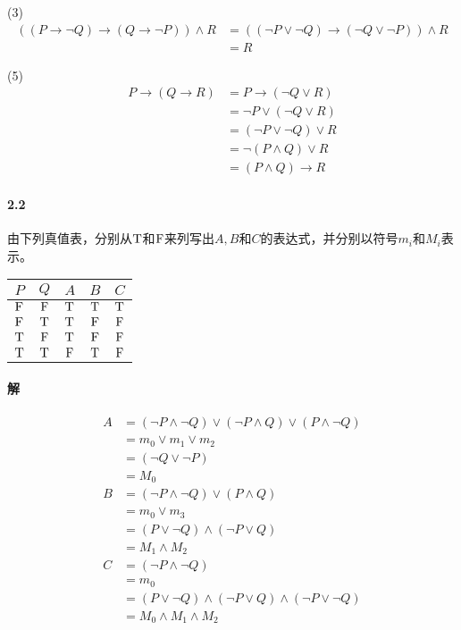 \documentclass[hyperref, UTF8]{ctexart}
\newcommand{\true}{{\rm T}}
\newcommand{\false}{{\rm F}}
\begin{document}
(3)
\begin{align*}
((P \rightarrow \lnot Q) \rightarrow (Q \rightarrow \lnot P)) \land R &=(( \lnot P \lor \lnot Q) \rightarrow ( \lnot Q \lor \lnot P)) \land R \\ &=R
\end{align*}

(5)
\begin{align*}
P \rightarrow (Q \rightarrow R)&=P \rightarrow ( \lnot Q \lor R) \\ &= \lnot P \lor ( \lnot Q \lor R) \\ &=( \lnot P \lor \lnot Q) \lor R \\ &= \lnot (P \land Q) \lor R \\ &=(P \land Q) \rightarrow R
\end{align*}

\paragraph{2.2}\label{2.2}
由下列真值表，分别从$\true$和$\false$来列写出$A, B$和$C$的表达式，并分别以符号$m_i$和$M_i$表示。

\begin{table}[!htb]
\centering
\begin{tabular}{ccccc}
\hline
$P$ & $Q$ & $A$ & $B$ & $C$ \\
\hline
$\false$ & $\false$ & $\true$ & $\true$ & $\true$ \\
$\false$ & $\true$ & $\true$ & $\false$ & $\false$ \\
$\true$ & $\false$ & $\true$ & $\false$ & $\false$ \\
$\true$ & $\true$ & $\false$ & $\true$ & $\false$ \\
\hline
\end{tabular}
\end{table}

\paragraph{解}

\begin{align*}
A
  & = ( \lnot P \land \lnot Q) \lor ( \lnot P \land Q) \lor (P \land \lnot Q) \\
  & = m_0 \lor m_1 \lor m_2 \\
  & = ( \lnot Q \lor \lnot P) \\
  & = M_0 \\
B
  & = ( \lnot P \land \lnot Q) \lor (P \land Q) \\
  & = m_0 \lor m_3 \\
  & = (P \lor \lnot Q) \land ( \lnot P \lor Q) \\
  & = M_1 \land M_2 \\
C
  & = ( \lnot P \land \lnot Q) \\
  & = m_0 \\
  & = (P \lor \lnot Q) \land ( \lnot P \lor Q) \land ( \lnot P \lor \lnot Q) \\
  & =M_0 \land M_1 \land M_2
\end{align*}
\end{document}
